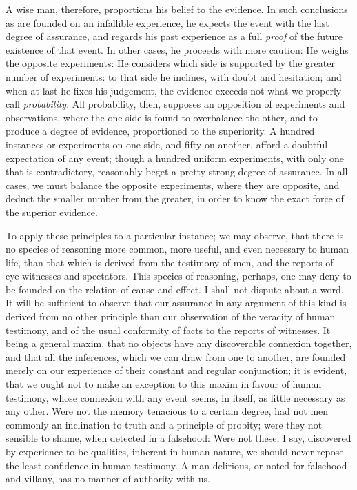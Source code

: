 \documentclass[]{article}
\begin{document}
\begin{sectionbody}
\humeparagraph  A wise man, therefore, proportions his belief to the evidence. In such conclusions as are founded on an infallible experience, he expects the event with the last degree of assurance, and regards his past experience as a full \emph{proof} of the future existence of that event. In other cases, he proceeds with more caution: He weighs the opposite experiments: He considers which side is supported by the greater number of experiments: to that side he inclines, with doubt and hesitation; and when at last he fixes his judgement, the evidence exceeds not what we properly call \emph{probability}. All probability, then, supposes an opposition of experiments and observations, where the one side is found to overbalance the other, and to produce a degree of evidence, proportioned to the superiority. A hundred instances or experiments on one side, and fifty on another, afford a doubtful expectation of any event; though a hundred uniform experiments, with only one that is contradictory, reasonably beget a pretty strong degree of assurance. In all cases, we must balance the opposite experiments, where they are opposite, and deduct the smaller number from the greater, in order to know the exact force of the superior evidence.

\humeparagraph  To apply these principles to a particular instance; we may observe, that there is no species of reasoning more common, more useful, and even necessary to human life, than that which is derived from the testimony of men, and the reports of eye-witnesses and spectators. This species of reasoning, perhaps, one may deny to be founded on the relation of cause and effect. I shall not dispute about a word. It will be sufficient to observe that our assurance in any argument of this kind is derived from no other principle than our observation of the veracity of human testimony, and of the usual conformity of facts to the reports of witnesses. It being a general maxim, that no objects have any discoverable connexion together, and that all the inferences, which we can draw from one to another, are founded merely on our experience of their constant and regular conjunction; it is evident, that we ought not to make an exception to this maxim in favour of human testimony, whose connexion with any event seems, in itself, as little necessary as any other. Were not the memory tenacious to a certain degree, had not men commonly an inclination to truth and a principle of probity; were they not sensible to shame, when detected in a falsehood: Were not these, I say, discovered by experience to be qualities, inherent in human nature, we should never repose the least confidence in human testimony. A man delirious, or noted for falsehood and villany, has no manner of authority with us.


\end{sectionbody}
\end{document}
